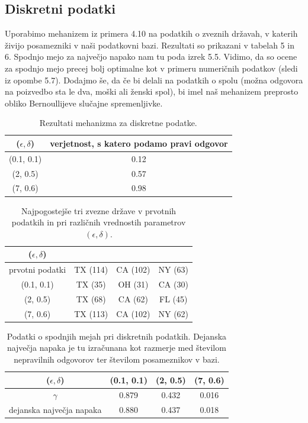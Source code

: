 \documentclass[12pt,a4paper]{amsart}
\theoremstyle{definition} %
\theoremstyle{plain} %
\begin{document}
\subsection{Diskretni podatki}
Uporabimo mehanizem iz primera 4.10 na podatkih o zveznih državah, v katerih živijo posamezniki v naši podatkovni bazi. Rezultati so prikazani v tabelah 5 in 6. Spodnjo mejo za največjo napako nam tu poda izrek 5.5. Vidimo, da so ocene za spodnjo mejo precej bolj optimalne kot v primeru numeričnih podatkov (sledi iz opombe 5.7). Dodajmo še, da če bi delali na podatkih o spolu (možna odgovora na poizvedbo sta le dva, moški ali ženski spol), bi imel naš mehanizem preprosto obliko Bernoullijeve slučajne spremenljivke.
\begin{table}[!htb]
\begin{center}
 \begin{tabular}{| c | c | } 
 \hline
($\epsilon, \delta$) & verjetnost, s katero podamo pravi odgovor  \\ [0.5ex] 
 \hline
(0.1, 0.1) & 0.12  \\ 
 \hline
 (2, 0.5) & 0.57  \\ 
 \hline
 (7, 0.6) & 0.98  \\ 
 \hline
\end{tabular}
\caption{Rezultati mehanizma za diskretne podatke. }
\end{center}
\end{table}

\begin{table}[!htb]
\begin{center}
 \begin{tabular}{| c | c | c | c|} 
 \hline
($\epsilon, \delta$) & & &  \\ [0.5ex] 
 \hline
prvotni podatki & TX (114) & CA (102) & NY (63)  \\ 
 \hline
(0.1, 0.1) & TX (35) & OH (31) & CA (30)  \\ 
 \hline
(2, 0.5) & TX (68) & CA (62) & FL (45)  \\ 
 \hline
(7, 0.6) & TX (113) & CA (102) & NY (62)  \\ 
 \hline
\end{tabular}
\caption{Najpogostejše tri zvezne države v prvotnih podatkih in pri različnih vrednostih parametrov $(\epsilon, \delta)$. }
\end{center}
\end{table}

\begin{table}[!htb]
\begin{center}
 \begin{tabular}{| c | c | c | c|} 
 \hline
($\epsilon, \delta$) & (0.1, 0.1) & (2, 0.5) & (7, 0.6)  \\ [0.5ex] 
 \hline
 $\gamma$ & 0.879 & 0.432 & 0.016  \\ 
 \hline
 dejanska največja napaka & 0.880 & 0.437 & 0.018\\
 \hline
\end{tabular}
\caption{Podatki o spodnjih mejah pri diskretnih podatkih. Dejanska največja napaka je tu izračunana kot razmerje med številom nepravilnih odgovorov ter številom posameznikov v bazi. }
\end{center}
\end{table}
\end{document}
